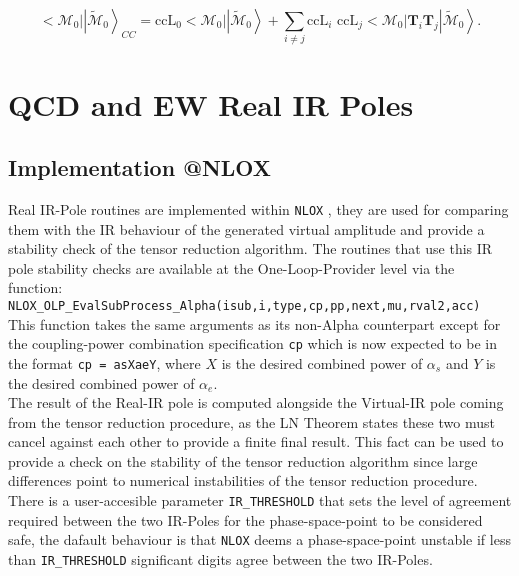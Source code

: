 \documentclass[a4paper]{article}
\def \NLOX{\texttt{NLOX} }
\begin{document}
\begin{equation}
  \Big<\mathcal{M}_0\Big|\left|\mathcal{\tilde M}_0\right>_{CC} = 
 \text{ccL}_0 \Big<\mathcal{M}_0\Big|\left|\mathcal{\tilde M}_0\right> +  
 \sum_{i \neq j} \text{ccL}_i\text{ ccL}_j 
 \Big<\mathcal{M}_0\Big|\textbf{T}_i\textbf{T}_j\left|\mathcal{\tilde M}_0\right>.
\end{equation}

\newpage
\section{QCD and EW Real IR Poles}
\subsection{Implementation @NLOX}

Real IR-Pole routines are implemented within \NLOX, they are used 
for comparing them with the IR behaviour of the generated virtual 
amplitude and provide a stability check of the tensor reduction algorithm. 
The routines that use this IR pole stability checks are available at the 
One-Loop-Provider level via the function:\\

\texttt{NLOX\_OLP\_EvalSubProcess\_Alpha(isub,i,type,cp,pp,next,mu,rval2,acc)}\\

This function takes the same arguments as its non-Alpha counterpart except for the coupling-power
combination specification \texttt{cp} which is now expected to be in the format \texttt{cp = asXaeY},
where $X$ is the desired combined power of $\alpha_s$ and $Y$ is the desired combined power of $\alpha_e$.\\

The result of the Real-IR pole is computed alongside the Virtual-IR pole coming from the tensor reduction
procedure, as the LN Theorem states these two must cancel against each other to provide a finite 
final result. This fact can be used to provide a check on the stability of the tensor reduction 
algorithm since large differences point to numerical instabilities of the tensor reduction 
procedure. There is a user-accesible parameter \texttt{IR\_THRESHOLD} that sets the level 
of agreement required between the two IR-Poles for the phase-space-point to be considered safe,
the dafault behaviour is that \NLOX deems a phase-space-point unstable if less than \texttt{IR\_THRESHOLD} significant digits agree between the two IR-Poles. \\
\end{document}
